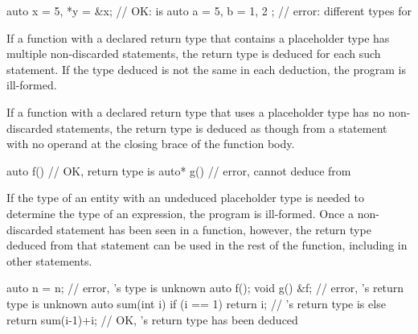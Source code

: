 \begin{example}
\begin{codeblock}
auto x = 5, *y = &x;            // OK:  is 
auto a = 5, b = { 1, 2 };       // error: different types for 
\end{codeblock}
\end{example}

\pnum
If a function with a declared return type that contains a placeholder type has
multiple non-discarded  statements, the return type is deduced for each
such  statement. If the type deduced is not the same in each
deduction, the program is ill-formed.

\pnum
If a function with a declared return type that uses a placeholder type has no
non-discarded  statements, the return type is deduced as though from a
 statement with no operand at the closing brace of the function
body.
\begin{example}
\begin{codeblock}
auto  f() { }                   // OK, return type is 
auto* g() { }                   // error, cannot deduce  from 
\end{codeblock}
\end{example}

\pnum
If the type of an entity with an undeduced placeholder type is needed to
determine the type of an expression, the program is ill-formed. Once a
non-discarded  statement has been seen in a function, however, the return type deduced
from that statement can be used in the rest of the function, including in other
 statements.
\begin{example}
\begin{codeblock}
auto n = n;                     // error, 's type is unknown
auto f();
void g() { &f; }                // error, 's return type is unknown
auto sum(int i) {
  if (i == 1)
    return i;                   // 's return type is 
  else
    return sum(i-1)+i;          // OK, 's return type has been deduced
}
\end{codeblock}
\end{example}


